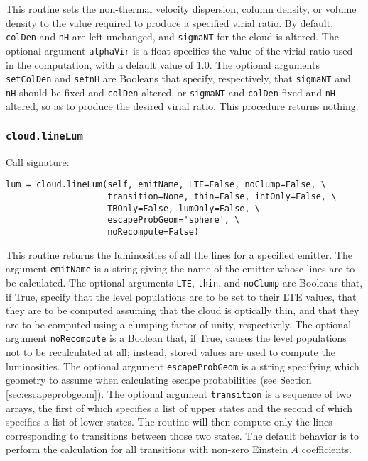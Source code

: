\documentclass[12pt]{article}
\begin{document}
This routine sets the non-thermal velocity dispersion, column density, or volume density to the value required to produce a specified virial ratio. By default, \verb=colDen= and \verb=nH= are left unchanged, and \verb=sigmaNT= for the cloud is altered. The optional argument \verb=alphaVir= is a float specifies the value of the virial ratio used in the computation, with a default value of 1.0. The optional arguments \verb=setColDen= and \verb=setnH= are Booleans that specify, respectively, that \verb=sigmaNT= and \verb=nH= should be fixed and \verb=colDen= altered, or \verb=sigmaNT= and \verb=colDen= fixed and \verb=nH= altered, so as to produce the desired virial ratio. This procedure returns nothing.


\subsubsection{\texttt{cloud.lineLum}}
\label{sec:linelum}

Call signature:

\begin{verbatim}
lum = cloud.lineLum(self, emitName, LTE=False, noClump=False, \
                    transition=None, thin=False, intOnly=False, \
                    TBOnly=False, lumOnly=False, \
                    escapeProbGeom='sphere', \
                    noRecompute=False)
\end{verbatim}

This routine returns the luminosities of all the lines for a specified emitter. The argument \verb=emitName= is a string giving the name of the emitter whose lines are to be calculated. The optional arguments \verb=LTE=, \verb=thin=, and \verb=noClump= are Booleans that, if True, specify that the level populations are to be set to their LTE values, that they are to be computed assuming that the cloud is optically thin, and that they are to be computed using a clumping factor of unity, respectively. The optional argument \verb=noRecompute= is a Boolean that, if True, causes the level populations not to be recalculated at all; instead, stored values are used to compute the luminosities. The optional argument \verb=escapeProbGeom= is a string specifying which geometry to assume when calculating escape probabilities (see Section \ref{sec:escapeprobgeom}). The optional argument \verb=transition= is a sequence of two arrays, the first of which specifies a list of upper states and the second of which specifies a list of lower states. The routine will then compute only the lines corresponding to transitions between those two states. The default behavior is to perform the calculation for all transitions with non-zero Einstein $A$ coefficients.
\end{document}
